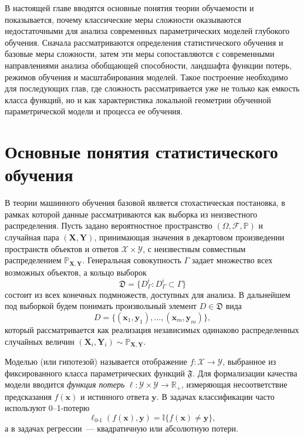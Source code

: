 В настоящей главе вводятся основные понятия теории обучаемости и показывается, почему классические меры сложности оказываются недостаточными для анализа современных параметрических моделей глубокого обучения.
Сначала рассматриваются определения статистического обучения и базовые меры сложности, затем эти меры сопоставляются с современными направлениями анализа обобщающей способности, ландшафта функции потерь, режимов обучения и масштабирования моделей.
Такое построение необходимо для последующих глав, где сложность рассматривается уже не только как емкость класса функций, но и как характеристика локальной геометрии обученной параметрической модели и процесса ее обучения.

\section{Основные понятия статистического обучения}

В теории машинного обучения базовой является стохастическая постановка, в рамках которой данные рассматриваются как выборка из неизвестного распределения. Пусть задано вероятностное пространство $(\Omega, \mathcal{F}, \mathbb{P})$ и случайная пара $(\mathbf{X}, \mathbf{Y})$, принимающая значения в декартовом произведении пространств объектов и ответов $\mathcal{X} \times \mathcal{Y}$, с неизвестным совместным распределением $\mathbb{P}_{\mathbf{X},\mathbf{Y}}$. Генеральная совокупность $\Gamma$ задает множество всех возможных объектов, а кольцо выборок
\[
    \mathfrak{D} = \{D_\Gamma^i : D_\Gamma^i \subset \Gamma\}
\]
состоит из всех конечных подмножеств, доступных для анализа. В дальнейшем под выборкой будем понимать произвольный элемент $D \in \mathfrak{D}$ вида
\[
    D = \{(\mathbf{x}_1, \mathbf{y}_1), \ldots, (\mathbf{x}_m, \mathbf{y}_m)\},
\]
который рассматривается как реализация независимых одинаково распределенных случайных величин $(\mathbf{X}_i, \mathbf{Y}_i) \sim \mathbb{P}_{\mathbf{X},\mathbf{Y}}$.

Моделью (или гипотезой) называется отображение $f \colon \mathcal{X} \to \mathcal{Y}$, выбранное из фиксированного класса параметрических функций $\mathfrak{F}$. Для формализации качества модели вводится \textit{функция потерь} $\ell \colon \mathcal{Y} \times \mathcal{Y} \to \mathbb{R}_{+}$, измеряющая несоответствие предсказания $f(\mathbf{x})$ и истинного ответа $\mathbf{y}$. В задачах классификации часто используют 0--1-потерю
\[
    \ell_{\mathrm{0\text{-}1}}(f(\mathbf{x}), \mathbf{y}) = \mathbb{I}\{f(\mathbf{x}) \neq \mathbf{y}\},
\]
а в задачах регрессии~--- квадратичную или абсолютную потери.

